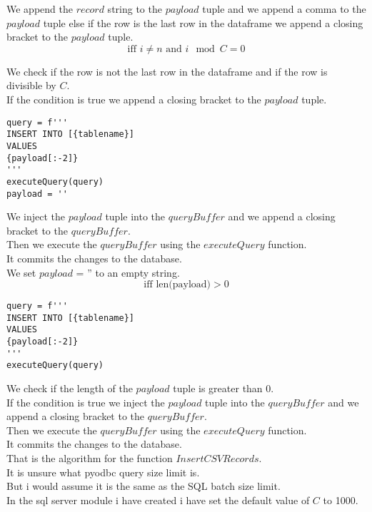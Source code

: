 We append the $record$ string to the $payload$ tuple and we append a comma to the $payload$ tuple else if the row is the last row in the dataframe we append a closing bracket to the $payload$ tuple. \\

\begin{equation}
\text{iff } i \neq n \text{ and } i \mod C = 0
\end{equation}

We check if the row is not the last row in the dataframe and if the row is divisible by $C$. \\
If the condition is true we append a closing bracket to the $payload$ tuple. \\

\begin{verbatim}
query = f'''
INSERT INTO [{tablename}]
VALUES
{payload[:-2]}
'''    
executeQuery(query)
payload = ''
\end{verbatim}

We inject the $payload$ tuple into the $queryBuffer$ and we append a closing bracket to the $queryBuffer$. \\
Then we execute the $queryBuffer$ using the $executeQuery$ function. \\
It commits the changes to the database. \\
We set $payload$ = '' to an empty string. \\

\begin{equation}
\text{iff len(payload)} > 0
\end{equation}

\begin{verbatim}
query = f'''
INSERT INTO [{tablename}]
VALUES
{payload[:-2]}
'''    
executeQuery(query)
\end{verbatim}

We check if the length of the $payload$ tuple is greater than 0. \\
If the condition is true we inject the $payload$ tuple into the $queryBuffer$ and we append a closing bracket to the $queryBuffer$. \\
Then we execute the $queryBuffer$ using the $executeQuery$ function. \\
It commits the changes to the database. \\

That is the algorithm for the function $InsertCSVRecords$. \\

It is unsure what pyodbc query size limit is. \\
But i would assume it is the same as the SQL batch size limit. \\
In the sql server module i have created i have set the default value of $C$ to 1000. \\

